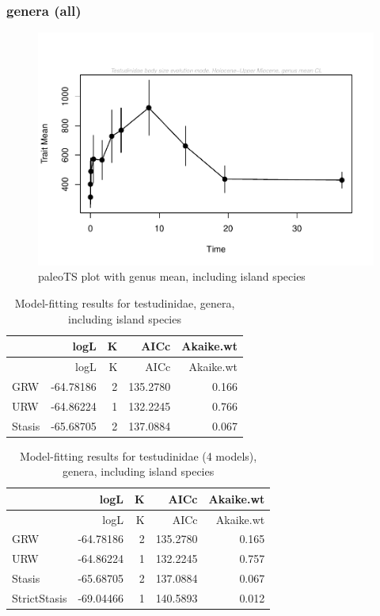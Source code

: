 \documentclass[]{article}
\begin{document}
\newpage

\subsubsection{genera (all)}\label{genera-all}

\begin{figure}[htbp]
\centering
\includegraphics{MA_JJ_files/figure-latex/paleoTS plot with genus mean, including island species-1.pdf}
\caption{paleoTS plot with genus mean, including island species}
\end{figure}

\begin{longtable}[]{@{}lrrrr@{}}
\caption{Model-fitting results for testudinidae, genera, including
island species}\tabularnewline
\toprule
& logL & K & AICc & Akaike.wt\tabularnewline
\midrule
\endfirsthead
\toprule
& logL & K & AICc & Akaike.wt\tabularnewline
\midrule
\endhead
GRW & -64.78186 & 2 & 135.2780 & 0.166\tabularnewline
URW & -64.86224 & 1 & 132.2245 & 0.766\tabularnewline
Stasis & -65.68705 & 2 & 137.0884 & 0.067\tabularnewline
\bottomrule
\end{longtable}

\begin{longtable}[]{@{}lrrrr@{}}
\caption{Model-fitting results for testudinidae (4 models), genera,
including island species}\tabularnewline
\toprule
& logL & K & AICc & Akaike.wt\tabularnewline
\midrule
\endfirsthead
\toprule
& logL & K & AICc & Akaike.wt\tabularnewline
\midrule
\endhead
GRW & -64.78186 & 2 & 135.2780 & 0.165\tabularnewline
URW & -64.86224 & 1 & 132.2245 & 0.757\tabularnewline
Stasis & -65.68705 & 2 & 137.0884 & 0.067\tabularnewline
StrictStasis & -69.04466 & 1 & 140.5893 & 0.012\tabularnewline
\bottomrule
\end{longtable}
\end{document}
